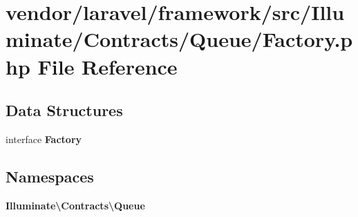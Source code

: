 \section{vendor/laravel/framework/src/\+Illuminate/\+Contracts/\+Queue/\+Factory.php File Reference}
\label{laravel_2framework_2src_2_illuminate_2_contracts_2_queue_2_factory_8php}
\subsection*{Data Structures}
\begin{DoxyCompactItemize}
\item 
interface {\bf Factory}
\end{DoxyCompactItemize}
\subsection*{Namespaces}
\begin{DoxyCompactItemize}
\item 
 {\bf Illuminate\textbackslash{}\+Contracts\textbackslash{}\+Queue}
\end{DoxyCompactItemize}
